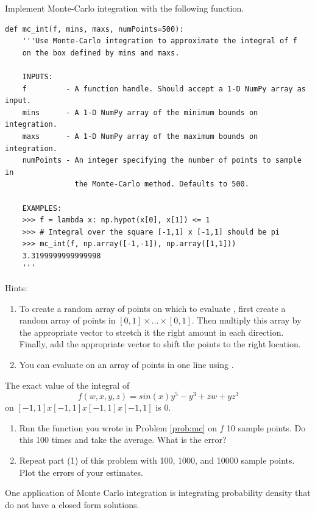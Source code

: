 \begin{problem}
\label{prob:mc}
Implement Monte-Carlo integration with the following function.
\begin{lstlisting}
def mc_int(f, mins, maxs, numPoints=500):
    '''Use Monte-Carlo integration to approximate the integral of f
    on the box defined by mins and maxs.
    
    INPUTS:
    f         - A function handle. Should accept a 1-D NumPy array as input.
    mins      - A 1-D NumPy array of the minimum bounds on integration.
    maxs      - A 1-D NumPy array of the maximum bounds on integration.
    numPoints - An integer specifying the number of points to sample in 
                the Monte-Carlo method. Defaults to 500.
                
    EXAMPLES:
    >>> f = lambda x: np.hypot(x[0], x[1]) <= 1
    >>> # Integral over the square [-1,1] x [-1,1] should be pi
    >>> mc_int(f, np.array([-1,-1]), np.array([1,1]))
    3.3199999999999998
    '''
\end{lstlisting}

Hints:
\begin{enumerate}
\item To create a random array of points on which to evaluate , first create a random array of points in $[0,1] \times \ldots \times [0,1]$.
Then multiply this array by the appropriate vector to stretch it the right amount in each direction.
Finally, add the appropriate vector to shift the points to the right location.
\item You can evaluate  on an array of points in one line using .
\end{enumerate}
\end{problem}

\begin{problem}
\label{prob:mc_test}
The exact value of the integral of
\[
f(w,x,y,z) = sin(x) y^5 -y^3 + zw + yz^3
\]
on $[-1,1]x[-1,1]x[-1,1]x[-1,1]$ is 0.
\begin{enumerate}
\item Run the function  you wrote in Problem \ref{prob:mc} on $f$ 10 sample points.
Do this 100 times and take the average. What is the error?
\item Repeat part (1) of this problem with 100, 1000, and 10000 sample points. 
Plot the errors of your estimates.
\end{enumerate}
\end{problem}

One application of Monte Carlo integration is integrating probability density that do not have a closed form solutions.

